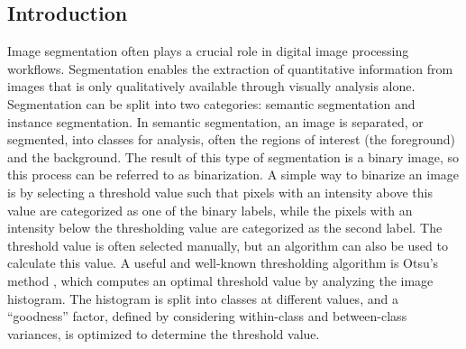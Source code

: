 \subsection{Introduction}
Image segmentation often plays a crucial role in digital image processing
workflows. Segmentation enables the extraction of quantitative information
from images that is only qualitatively available through visually analysis
alone. Segmentation can be split into two categories: semantic segmentation
and instance segmentation. In semantic segmentation, an image is separated,
or segmented, into classes for analysis, often the regions of interest
(the foreground) and the background.
The result of this type of segmentation is a binary
image, so this process can be referred to as binarization. A simple way to
binarize an image is by selecting a threshold value such that pixels with an
intensity above this value are categorized as one of the binary labels,
while the pixels with an intensity below the thresholding value are
categorized as the second label. The threshold value is often selected
manually, but an algorithm can also be used to calculate this value. A
useful and well-known thresholding algorithm is Otsu's method \cite{Otsu1979},
which computes an
optimal threshold value by analyzing the image histogram. The histogram is
split into classes at different values, and a ``goodness'' factor, defined
by considering within-class and between-class variances, is optimized to
determine the threshold value.


